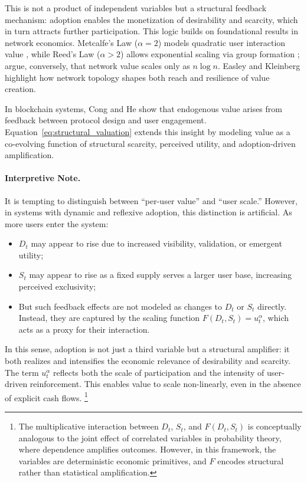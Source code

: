 \documentclass[12pt]{article}
\begin{document}
This is not a product of independent variables but a structural feedback mechanism: adoption enables the monetization of desirability and scarcity, which in turn attracts further participation. This logic builds on foundational results in network economics. Metcalfe’s Law (\( \alpha = 2 \)) models quadratic user interaction value \citep{metcalfe1995metcalfe}, while Reed’s Law (\( \alpha > 2 \)) allows exponential scaling via group formation \citep{reed2001law}; \citet{briscoe2006metcalfe} argue, conversely, that network value scales only as \( n \log n \). Easley and Kleinberg \citep{easley2010networks} highlight how network topology shapes both reach and resilience of value creation.

In blockchain systems, Cong and He \citep{cong2019blockchain} show that endogenous value arises from feedback between protocol design and user engagement. Equation~\eqref{eq:structural_valuation} extends this insight by modeling value as a co-evolving function of structural scarcity, perceived utility, and adoption-driven amplification.

\paragraph{Interpretive Note.}
It is tempting to distinguish between “per-user value” and “user scale.” However, in systems with dynamic and reflexive adoption, this distinction is artificial. As more users enter the system:
\begin{itemize}
    \item \( D_t \) may appear to rise due to increased visibility, validation, or emergent utility;
    \item \( S_t \) may appear to rise as a fixed supply serves a larger user base, increasing perceived exclusivity;
    \item But such feedback effects are not modeled as changes to \( D_t \) or \( S_t \) directly. Instead, they are captured by the scaling function \( F(D_t, S_t) = u_t^\alpha \), which acts as a proxy for their interaction.
\end{itemize}

In this sense, adoption is not just a third variable but a structural amplifier: it both realizes and intensifies the economic relevance of desirability and scarcity. The term \( u_t^\alpha \) reflects both the scale of participation and the intensity of user-driven reinforcement. This enables value to scale non-linearly, even in the absence of explicit cash flows. \footnote{The multiplicative interaction between \( D_t \), \( S_t \), and \( F(D_t, S_t) \) is conceptually analogous to the joint effect of correlated variables in probability theory, where dependence amplifies outcomes. However, in this framework, the variables are deterministic economic primitives, and \( F \) encodes structural rather than statistical amplification.}
\end{document}
